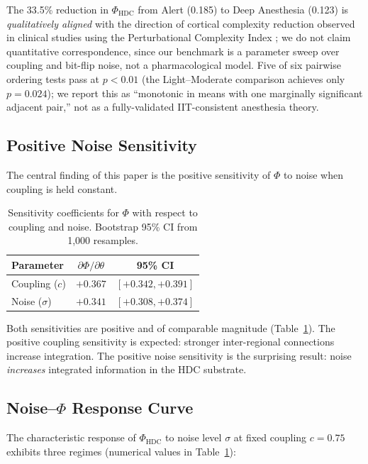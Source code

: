 \documentclass[12pt,a4paper]{article}
\begin{document}
The 33.5\% reduction in $\Phi_{\text{HDC}}$ from Alert (0.185) to Deep Anesthesia (0.123) is \emph{qualitatively aligned} with the direction of cortical complexity reduction observed in clinical studies using the Perturbational Complexity Index \citep{casali2013theoretically}; we do not claim quantitative correspondence, since our benchmark is a parameter sweep over coupling and bit-flip noise, not a pharmacological model. Five of six pairwise ordering tests pass at $p < 0.01$ (the Light--Moderate comparison achieves only $p = 0.024$); we report this as ``monotonic in means with one marginally significant adjacent pair,'' not as a fully-validated IIT-consistent anesthesia theory.

\subsection{Positive Noise Sensitivity}

The central finding of this paper is the positive sensitivity of $\Phi$ to noise when coupling is held constant.

\begin{table}[H]
\centering
\caption{Sensitivity coefficients for $\Phi$ with respect to coupling and noise. Bootstrap 95\% CI from 1,000 resamples.}
\label{tab:sensitivity}
\begin{tabular}{lcc}
\toprule
\textbf{Parameter} & \textbf{$\partial\Phi / \partial\theta$} & \textbf{95\% CI} \\
\midrule
Coupling ($c$) & $+0.367$ & $[+0.342, +0.391]$ \\
Noise ($\sigma$) & $+0.341$ & $[+0.308, +0.374]$ \\
\bottomrule
\end{tabular}
\end{table}

Both sensitivities are positive and of comparable magnitude (Table~\ref{tab:sensitivity}). The positive coupling sensitivity is expected: stronger inter-regional connections increase integration. The positive noise sensitivity is the surprising result: noise \emph{increases} integrated information in the HDC substrate.

\subsection{Noise--$\Phi$ Response Curve}

The characteristic response of $\Phi_{\text{HDC}}$ to noise level $\sigma$ at fixed coupling $c = 0.75$ exhibits three regimes (numerical values in Table~\ref{tab:sensitivity}):
\end{document}
